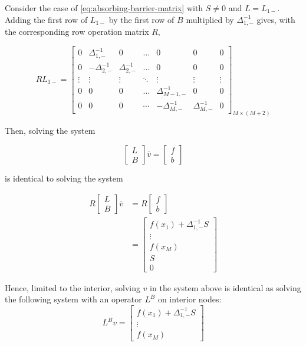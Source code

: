 \documentclass[11pt]{article}
\theoremstyle{definition}
\begin{document}
Consider the case of \cref{eq:absorbing-barrier-matrix} with $S\neq 0$ and $L = L_{1-}$. Adding the first row of $L_{1-}$ by the first row of $B$ multiplied by $\Delta_{1,-}^{-1}$ gives, with the corresponding row operation matrix $R$, 

\begin{equation}
R {L}_{1-} = \begin{bmatrix}
0&\Delta_{1,-}^{-1} &0&\dots&0&0&0\\
0&-\Delta_{2,-}^{-1}&\Delta_{2,-}^{-1}&\dots&0&0&0\\
\vdots&\vdots&\vdots&\ddots&\vdots&\vdots&\vdots\\
0&0&0&\dots&\Delta_{M-1,-}^{-1}&0&0\\
0&0&0&\cdots&-\Delta_{M,-}^{-1}&\Delta_{M,-}^{-1}&0
\end{bmatrix}_{M\times (M+2)}
\end{equation}

Then, solving the system 

\begin{equation}
\begin{bmatrix}
 L \\
 B
\end{bmatrix} 
\overline{v} 
=
\begin{bmatrix}
f \\
b
\end{bmatrix}
\end{equation}

is identical to solving the system

\begin{align}
R\begin{bmatrix}
 L \\
 B
\end{bmatrix} 
\overline{v}
&= 
R\begin{bmatrix}
f \\
b
\end{bmatrix} \\
&= \begin{bmatrix}
 f(x_1) + \Delta_{1,-}^{-1}S \\
 \vdots \\
 f(x_M) \\
 S \\
 0
\end{bmatrix}
\end{align}

Hence, limited to the interior, solving $v$ in the system above is identical as solving the following system with an operator $L^B$ on interior nodes:
\begin{equation}
L^Bv=\begin{bmatrix}
f(x_1) + \Delta_{1,-}^{-1}S\\
\vdots \\
f(x_M)
\end{bmatrix}
\end{equation}
\end{document}
